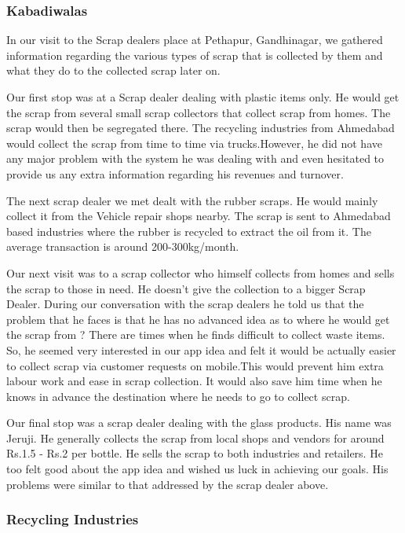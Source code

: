 \documentclass{article}
\begin{document}
\subsubsection{Kabadiwalas}
\par  In our visit to the Scrap dealers place at Pethapur, Gandhinagar, we gathered information regarding the various types of scrap that is collected by them and what they do to the collected scrap later on.

\par Our first stop was at a Scrap dealer dealing with plastic items only. He would get the scrap from several small scrap collectors that collect scrap from homes. The scrap would then be segregated there. The recycling industries from Ahmedabad would collect the scrap from time to time via trucks.However, he did not have any major problem with the system he was dealing with and even hesitated to provide us any extra information regarding his revenues and turnover.

\par The next scrap dealer we met dealt with the rubber scraps. He would mainly collect it from the Vehicle repair shops nearby. The scrap is sent to Ahmedabad based industries where the rubber is recycled to extract the oil from it. The average transaction is around 200-300kg/month.  
\par Our next visit was to a scrap collector who himself collects from homes and sells the scrap to those in need. He doesn't give the collection to a bigger Scrap Dealer. During our conversation with the scrap dealers he told us that the problem that he faces is that he has no advanced idea as to where he would get the scrap from ? There are times when he finds difficult to collect waste items. So, he seemed very interested in our app idea and felt it would be actually easier to collect scrap via customer requests on mobile.This would prevent him extra labour work and ease in scrap collection. It would also save him time when he knows in advance the destination where he needs to go to collect scrap.
\par Our final stop was a scrap dealer dealing with the glass products. His name was Jeruji. He generally collects the scrap from local shops and vendors for around Rs.1.5 - Rs.2 per bottle. He sells the scrap to both industries and retailers. He too felt good about the app idea and wished us luck in achieving our goals. His problems were similar to that addressed by the scrap dealer above.

\subsubsection{Recycling Industries}
\end{document}
